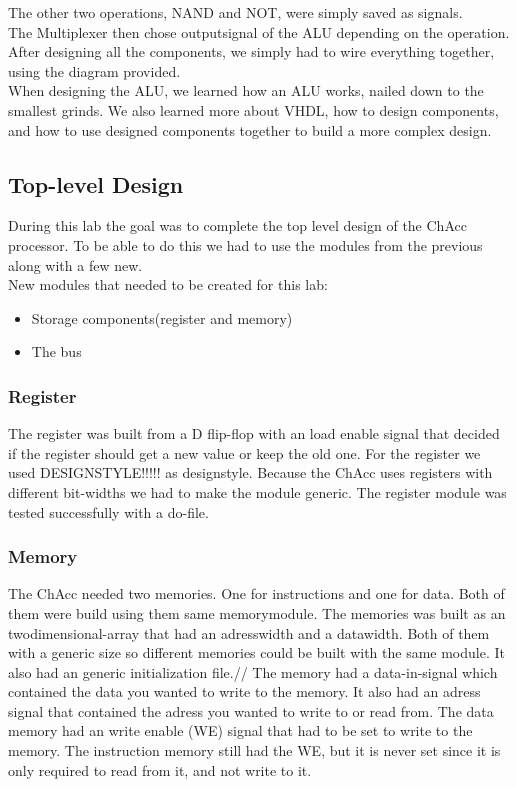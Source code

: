 \documentclass[a4paper]{article}
\begin{document}
The other two operations, NAND and NOT, were simply saved as signals.\\
The Multiplexer then chose outputsignal of the ALU depending on the operation.\\

After designing all the components, we simply had to wire everything together, using the diagram provided.\\

When designing the ALU, we learned how an ALU works, nailed down to the smallest grinds. We also learned more about VHDL, how to design components, and how to use designed components together to build a more complex design.
\subsection{Top-level Design}

During this lab the goal was to complete the top level design of the ChAcc processor.
To be able to do this we had to use the modules from the previous along with a few new.\\

New modules that needed to be created for this lab:

\begin{itemize}
	
    \item Storage components(register and memory)
    \item The bus
    
\end{itemize}

\subsubsection{Register}

The register was built from a D flip-flop with an load enable signal that decided if the register should get a new value or keep the old one.
For the register we used DESIGNSTYLE!!!!! as designstyle.
Because the ChAcc uses registers with different bit-widths we had to make the module generic. The register module was tested successfully with a do-file.

\subsubsection{Memory}

The ChAcc needed two memories. One for instructions and one for data.
Both of them were build using them same memorymodule.
The memories was built as an twodimensional-array that had an adresswidth and a datawidth. Both of them with a generic size so different memories could be built with the same module. It also had an generic initialization file.//
The memory had a data-in-signal which contained the data you wanted to write to the memory. It also had an adress signal that contained the adress you wanted to write to or read from.
The data memory had an write enable (WE) signal that had to be set to write to the memory.
The instruction memory still had the WE, but it is never set since it is only required to read from it, and not write to it.
\end{document}
